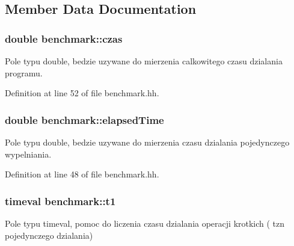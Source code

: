 \subsection{Member Data Documentation}
\hypertarget{classbenchmark_a563b747421276232836b7711b6881ec8}{
\subsubsection[{czas}]{\setlength{\rightskip}{0pt plus 5cm}double benchmark\-::czas\hspace{0.3cm}{\ttfamily [private]}}}\label{classbenchmark_a563b747421276232836b7711b6881ec8}


Pole typu double, bedzie uzywane do mierzenia calkowitego czasu dzialania programu. 



Definition at line 52 of file benchmark.\-hh.

\hypertarget{classbenchmark_a90e6eda0144befd3f3bc1a881904fb57}{
\subsubsection[{elapsed\-Time}]{\setlength{\rightskip}{0pt plus 5cm}double benchmark\-::elapsed\-Time\hspace{0.3cm}{\ttfamily [private]}}}\label{classbenchmark_a90e6eda0144befd3f3bc1a881904fb57}


Pole typu double, bedzie uzywane do mierzenia czasu dzialania pojedynczego wypelniania. 



Definition at line 48 of file benchmark.\-hh.

\hypertarget{classbenchmark_a7789217b36df3b3ae427ceaaa2694d0b}{
\subsubsection[{t1}]{\setlength{\rightskip}{0pt plus 5cm}timeval benchmark\-::t1\hspace{0.3cm}{\ttfamily [private]}}}\label{classbenchmark_a7789217b36df3b3ae427ceaaa2694d0b}


Pole typu timeval, pomoc do liczenia czasu dzialania operacji krotkich ( tzn pojedynczego dzialania) 



